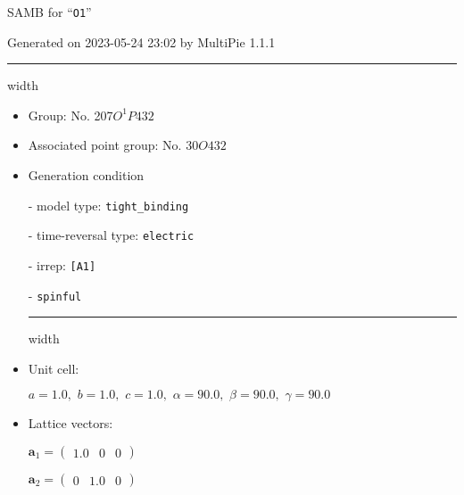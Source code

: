 \documentclass[fleqn,10pt,landscape]{article}
\begin{document}
\setcounter{MaxMatrixCols}{16}

\setlength{\baselineskip}{16pt}
\footnotesize
\begin{center}
\LARGE
SAMB for ``\texttt{O1}''
\end{center}
\begin{flushright}
Generated on 2023-05-24 23:02 by MultiPie 1.1.1
\end{flushright}
\vspace{1cm}


 \hfil \hrule height 1mm width \textwidth \hfil

\begin{itemize}
\item Group: No. 207\quad$O_{}^{1}$\quad$P432$\quad[ cubic ]

\item Associated point group: No. 30\quad$O$\quad$432$\quad[ cubic ]

\vspace{5mm}

\item Generation condition

\quad - model type: \texttt{tight_binding}

\quad - time-reversal type: \texttt{electric}

\quad - irrep: \texttt{[A1]}

\quad - \texttt{spinful}


 \hfil \hrule height 1mm width \textwidth \hfil

\item Unit cell:

\quad $a=1.0,\,\, b=1.0,\,\, c=1.0,\,\, \alpha=90.0,\,\, \beta=90.0,\,\, \gamma=90.0$

\item Lattice vectors:

\quad $\bm{a}_1=\begin{pmatrix} 1.0 & 0 & 0 \end{pmatrix}$

\quad $\bm{a}_2=\begin{pmatrix} 0 & 1.0 & 0 \end{pmatrix}$


\end{itemize}
\end{document}
